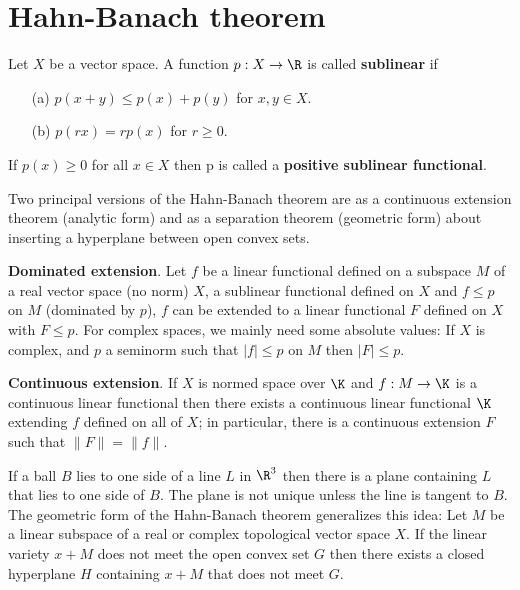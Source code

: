 \chapter{Hahn-Banach theorem}
\begin{definition}
Let $X$ be a vector space. A function $p:X\to\R$ is called \textbf{sublinear} if
\begin{itemize}
\item[(a)] $p(x+y)\leq p(x)+p(y)$ for $x,y\in X$.
\item[(b)] $p(rx)=rp(x)$ for $r\geq 0$.
\end{itemize}
If $p(x)\geq 0$ for all $x\in X$ then p is called a \textbf{positive sublinear functional}.
\end{definition}
Two principal versions of the Hahn-Banach theorem are as a continuous extension theorem (analytic form) and as a separation theorem (geometric form) about inserting a hyperplane between open convex sets.\par
\textbf{Dominated extension}. Let $f$ be a linear functional defined on a subspace $M$ of a real vector space (no norm) $X$, a sublinear functional defined on $X$ and $f\leq p$ on $M$ (dominated by $p$), $f$ can be extended to a linear functional $F$ defined on $X$ with $F\leq p$. For complex spaces, we mainly need some absolute values: If $X$ is complex, and $p$ a seminorm such that $|f|\leq p$ on $M$ then $|F|\leq p$.\par
\textbf{Continuous extension}. If $X$ is normed space over $\K$ and $f:M\to\K$ is a continuous linear functional then there exists a continuous linear functional $\K$ extending $f$ defined on all of $X$; in particular, there is a continuous extension $F$ such that $\|F\|=\|f\|$.\par
If a ball $B$ lies to one side of a line $L$ in $\R^3$ then there is a plane containing $L$ that lies to one side of $B$. The plane is not unique unless the line is tangent to $B$. The geometric form of the Hahn-Banach theorem generalizes this idea: Let $M$ be a linear subspace of a real or complex topological vector space $X$. If the linear variety $x+M$ does not meet the open convex set $G$ then there exists a closed hyperplane $H$ containing $x+M$ that does not meet $G$.
